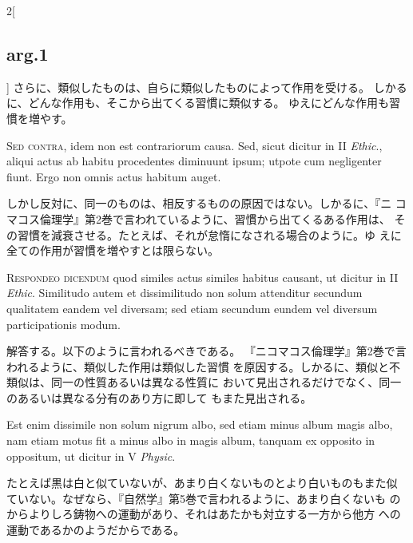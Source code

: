 \documentclass[paper=a4paper,fontsize=10pt,jafontsize=9pt,titlepage]{jlreq}
\begin{document}
\begin{paracol}{2}[\subsection{arg.1}]
さらに、類似したものは、自らに類似したものによって作用を受ける。
しかるに、どんな作用も、そこから出てくる習慣に類似する。
ゆえにどんな作用も習慣を増やす。

\switchcolumn*[\subsection{s.c.}]

{\scshape Sed contra}, idem non est contrariorum causa. Sed, sicut dicitur in II
{\itshape Ethic}., aliqui actus ab habitu procedentes diminuunt ipsum; utpote cum
negligenter fiunt. Ergo non omnis actus habitum auget.

\switchcolumn

しかし反対に、同一のものは、相反するものの原因ではない。しかるに、『ニ
 コマコス倫理学』第2巻で言われているように、習慣から出てくるある作用は、
 その習慣を減衰させる。たとえば、それが怠惰になされる場合のように。ゆ
 えに全ての作用が習慣を増やすとは限らない。


{\scshape Respondeo dicendum} quod similes actus similes habitus causant, ut
dicitur in II {\itshape Ethic}. Similitudo autem et dissimilitudo non solum
attenditur secundum qualitatem eandem vel diversam; sed etiam secundum
eundem vel diversum participationis modum.

\switchcolumn

解答する。以下のように言われるべきである。
『ニコマコス倫理学』第2巻で言われるように、類似した作用は類似した習慣
 を原因する。しかるに、類似と不類似は、同一の性質あるいは異なる性質に
 おいて見出されるだけでなく、同一のあるいは異なる分有のあり方に即して
 もまた見出される。

\switchcolumn*

Est enim dissimile non
solum nigrum albo, sed etiam minus album magis albo, nam etiam motus
fit a minus albo in magis album, tanquam ex opposito in oppositum, ut
dicitur in V {\itshape Physic}.

\switchcolumn

たとえば黒は白と似ていないが、あまり白くないものとより白いものもまた似
 ていない。なぜなら、『自然学』第5巻で言われるように、あまり白くないも
 のからよりしろ鋳物への運動があり、それはあたかも対立する一方から他方
 への運動であるかのようだからである。

\switchcolumn*


\end{paracol}
\end{document}
